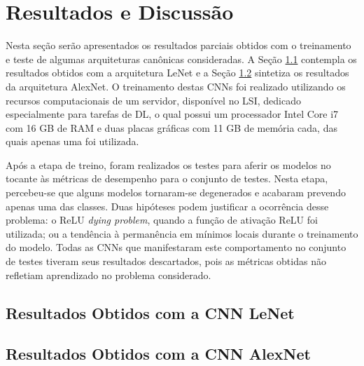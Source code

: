 
\chapter{Resultados e Discussão} \label{cap:resultados}


Nesta seção serão apresentados os resultados parciais obtidos com o treinamento e teste de algumas arquiteturas canônicas consideradas. A Seção \ref{sec:lenet}  contempla os resultados obtidos com a arquitetura LeNet e a Seção  \ref{sec:alexnet} sintetiza os resultados da arquitetura AlexNet. O treinamento destas CNNs foi realizado utilizando os recursos computacionais de um servidor, disponível no LSI, dedicado especialmente para tarefas de DL, o qual possui um processador Intel Core i7 com 16 GB de RAM e duas placas gráficas com 11 GB de memória cada, das quais apenas uma foi utilizada.

Após a etapa de treino, foram realizados os testes para aferir os modelos no tocante às métricas de desempenho para o conjunto de testes. Nesta etapa, percebeu-se que alguns modelos tornaram-se degenerados e acabaram prevendo apenas uma das classes. Duas hipóteses podem justificar a ocorrência desse problema: o ReLU \emph{dying problem}, quando a função de ativação ReLU foi utilizada; ou a tendência à permanência em mínimos locais durante o treinamento do modelo. Todas as CNNs que manifestaram este comportamento no conjunto de testes tiveram seus resultados descartados, pois as métricas obtidas não refletiam aprendizado no problema considerado.


\section{Resultados Obtidos com a CNN LeNet}
\label{sec:lenet}


\section{Resultados Obtidos com a CNN AlexNet}
\label{sec:alexnet}

